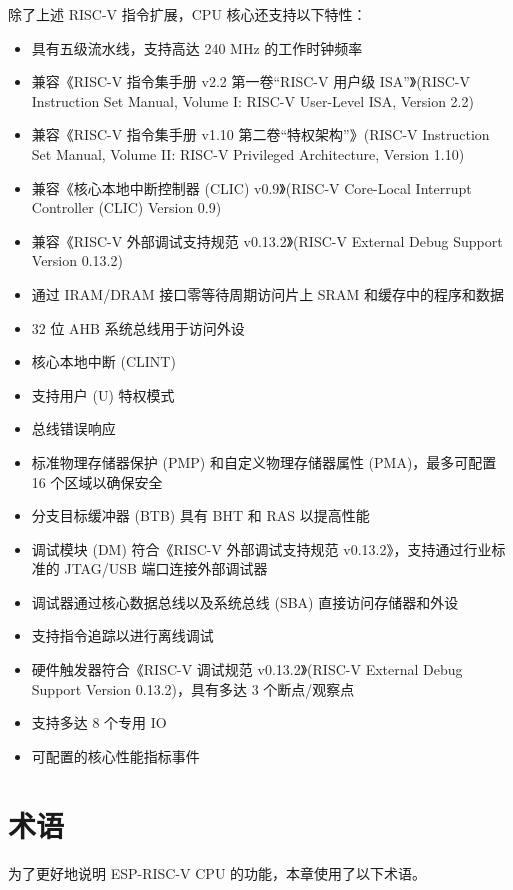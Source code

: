 \documentclass[main\_\_CN.tex]{subfiles}
\begin{document}
除了上述 RISC-V 指令扩展，CPU 核心还支持以下特性：
\begin{itemize}
    \item 具有五级流水线，支持高达 240 MHz 的工作时钟频率
    \item 兼容《RISC-V 指令集手册 v2.2 第一卷“RISC-V 用户级 ISA”》(RISC-V Instruction Set Manual, Volume I: RISC-V User-Level ISA, Version 2.2)
    \item 兼容《RISC-V 指令集手册 v1.10 第二卷“特权架构”》(RISC-V Instruction Set Manual, Volume II: RISC-V Privileged Architecture, Version 1.10)
    \item 兼容《核心本地中断控制器 (CLIC) v0.9》(RISC-V Core-Local Interrupt Controller (CLIC) Version 0.9)
    \item 兼容《RISC-V 外部调试支持规范 v0.13.2》(RISC-V External Debug Support Version 0.13.2)
    \item 通过 IRAM/DRAM 接口零等待周期访问片上 SRAM 和缓存中的程序和数据
    \item 32 位 AHB 系统总线用于访问外设
    \item 核心本地中断 (CLINT)
    \item 支持用户 (U) 特权模式
    \item 总线错误响应
    \item 标准物理存储器保护 (PMP) 和自定义物理存储器属性 (PMA)，最多可配置 16 个区域以确保安全
    \item 分支目标缓冲器 (BTB) 具有 BHT 和 RAS 以提高性能
    \item 调试模块 (DM) 符合《RISC-V 外部调试支持规范 v0.13.2》，支持通过行业标准的 JTAG/USB 端口连接外部调试器
    \item 调试器通过核心数据总线以及系统总线 (SBA) 直接访问存储器和外设
    \item 支持指令追踪以进行离线调试
    \item 硬件触发器符合《RISC-V 调试规范 v0.13.2》(RISC-V External Debug Support Version 0.13.2)，具有多达 3 个断点/观察点
    \item 支持多达 8 个专用 IO
    \item 可配置的核心性能指标事件

\end{itemize}

\section{术语}

为了更好地说明 ESP-RISC-V CPU 的功能，本章使用了以下术语。
\end{document}
